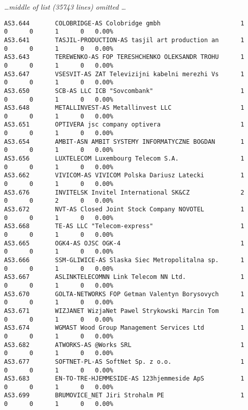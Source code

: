 \begin{center}
\emph{\ldots middle of list (35743 lines) omitted \ldots}
\end{center}
\begin{lstlisting}[frame=brl]
AS3.644       COLOBRIDGE-AS Colobridge gmbh                      1      0      0      1      0   0.00%
AS3.641       TASJIL-PRODUCTION-AS tasjil art production an      1      0      0      1      0   0.00%
AS3.643       TEREWENKO-AS FOP TERESHCHENKO OLEKSANDR TROHU      1      0      0      1      0   0.00%
AS3.647       VSESVIT-AS ZAT Televizijni kabelni merezhi Vs      1      0      0      1      0   0.00%
AS3.650       SCB-AS LLC ICB "Sovcombank"                        1      0      0      1      0   0.00%
AS3.648       METALLINVEST-AS Metallinvest LLC                   1      0      0      1      0   0.00%
AS3.651       OPTIVERA jsc company optivera                      1      0      0      1      0   0.00%
AS3.654       AMBIT-ASN AMBIT SYSTEMY INFORMATYCZNE BOGDAN       1      0      0      1      0   0.00%
AS3.656       LUXTELECOM Luxembourg Telecom S.A.                 1      0      0      1      0   0.00%
AS3.662       VIVICOM-AS VIVICOM Polska Dariusz Latecki          1      0      0      1      0   0.00%
AS3.676       INVITELSK Invitel International SK&CZ              2      0      0      2      0   0.00%
AS3.672       NVT-AS Closed Joint Stock Company NOVOTEL          1      0      0      1      0   0.00%
AS3.668       TE-AS LLC "Telecom-express"                        1      0      0      1      0   0.00%
AS3.665       OGK4-AS OJSC OGK-4                                 1      0      0      1      0   0.00%
AS3.666       SSM-GLIWICE-AS Slaska Siec Metropolitalna sp.      1      0      0      1      0   0.00%
AS3.667       ASLINKTELECOMNN Link Telecom NN Ltd.               1      0      0      1      0   0.00%
AS3.670       GOLTA-NETWORKS FOP Getman Valentyn Borysovych      1      0      0      1      0   0.00%
AS3.671       WIZJANET WizjaNet Pawel Strykowski Marcin Tom      1      0      0      1      0   0.00%
AS3.674       WGMAST Wood Group Management Services Ltd          1      0      0      1      0   0.00%
AS3.682       ATWORKS-AS @Works SRL                              1      0      0      1      0   0.00%
AS3.677       SOFTNET-PL-AS SoftNet Sp. z o.o.                   1      0      0      1      0   0.00%
AS3.683       EN-TO-TRE-HJEMMESIDE-AS 123hjemmeside ApS          1      0      0      1      0   0.00%
AS3.699       BRUMOVICE_NET Jiri Strohalm PE                     1      0      0      1      0   0.00%

\end{lstlisting}
